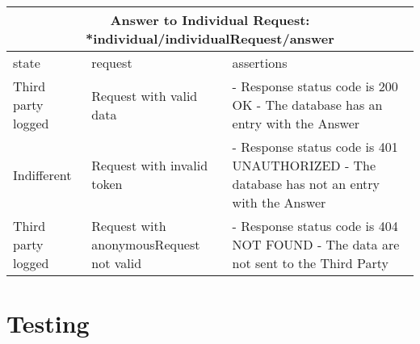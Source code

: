 \begin{center}
	\begin{tabular}{|p{}|p{}|p{}|}
		\hline
		\multicolumn{3}{c}{Answer to Individual Request: *individual/individualRequest/answer}\\

		\hline
		state & request & assertions \\
		
		\hline
		Third party logged&
		Request with valid data & 
		- Response status code is 200 OK\newline
		- The database has an entry with the Answer
		\\
		
		\hline
		Indifferent&
		Request with invalid token & 
		- Response status code is 401 UNAUTHORIZED \newline
		- The database has not an entry with the Answer
		\\
		
		\hline
		Third party logged&
		Request with anonymousRequest not valid& 
		- Response status code is 404 NOT FOUND \newline
		- The data are not sent to the Third Party
		\\

	\end{tabular}
\end{center}



\section{Testing}
